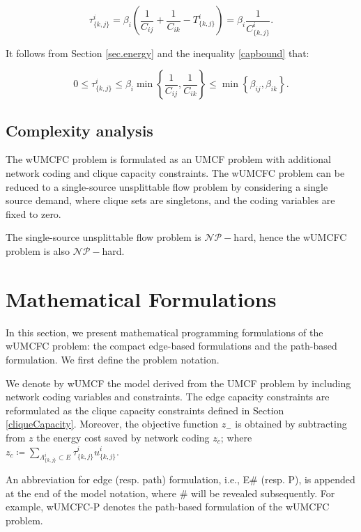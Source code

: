 \begin{equation}
\tau^i_{\{k,j\}} = \beta_{i}\left(\frac{1}{C_{ij}} + \frac{1}{C_{ik}} - T^i_{\{k,j\}}\right) = \beta_i \frac{1}{C^i_{\{k,j\}}}. \end{equation}


It follows from Section \ref{sec.energy} and the inequality \eqref{capbound} that:

\begin{equation}
\label{redbound}
0 \le \tau^i_{\{k,j\}} \le \beta_i \min  \left \{  \frac{1}{C_{ij}},  \frac{1}{C_{ik}}  \right \} \le \min\left \{\beta_{ij}, \beta_{ik}\right\}.
\end{equation}


\subsection{Complexity analysis}
The wUMCFC problem is formulated as an UMCF problem with additional network coding and clique capacity constraints.
 The wUMCFC problem can be reduced to a single-source unsplittable flow problem \cite{dinitz1999single,kleinberg1996single, kleinberg1998decision,martens2007convex} by considering a single source demand, where clique sets are singletons, and the coding variables are fixed to zero.
 
The single-source unsplittable flow problem is \(\mathcal{NP}-\)hard, hence the wUMCFC problem is also \(\mathcal{NP}-\)hard.

\section{Mathematical Formulations} \label{sec2}

In this section, we present mathematical programming formulations of the wUMCFC problem: the compact edge-based formulations and the path-based formulation. We first define the problem notation.

We denote by wUMCF the model derived from the UMCF problem by including network coding variables and constraints. The edge capacity constraints are reformulated as the clique capacity constraints defined in Section \ref{cliqueCapacity}.
 Moreover, the objective function \(z_{-}\) is obtained by subtracting from \(z\) the energy cost saved by network coding \(z_c\); where \(z_c \coloneqq \sum_{\Lambda^i_{\{k,j\}} \subset E}\tau^i_{\{k,j\}}u^i_{\{k,j\}}\). 

An abbreviation for edge (resp. path) formulation, i.e., E$\#$ (resp. P), is appended at the end of the model notation, where $\#$ will be revealed subsequently. For example, wUMCFC-P denotes the path-based formulation of the wUMCFC problem.

